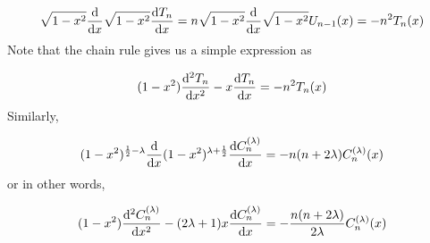 \documentclass[12pt,landscape]{article}
\def\half{ {1 \over 2} }
\def\D{ {\rm d} }
\def\dx{\D x}
\begin{document}
{\[
\sqrt{1-x^2} {\D \over \dx} \sqrt{1-x^2} {\D T_n \over \dx} =
n \sqrt{1-x^2} {\D \over \dx} \sqrt{1-x^2} U_{n-1}(x) = -n^2 T_n(x)
\]
Note that the chain rule gives us a simple expression as

\[
(1-x^2) {\D^2 T_n \over \dx^2} -x {\D T_n \over \dx} = -n^2 T_n(x)
\]
Similarly,

\[
(1-x^2)^{\half - \lambda} {\D \over \dx}(1-x^2)^{\lambda + \half} {\D C_n^{(\lambda)} \over \dx} = -n (n+2 \lambda) C_n^{(\lambda)}(x)
\]
or in other words,

\[
(1-x^2) {\D^2 C_n^{(\lambda)} \over \dx^2} - (2\lambda+1) x {\D C_n^{(\lambda)} \over \dx}  = -{n (n+2 \lambda) \over 2\lambda}C_n^{(\lambda)}(x)
\]

}
\end{document}
